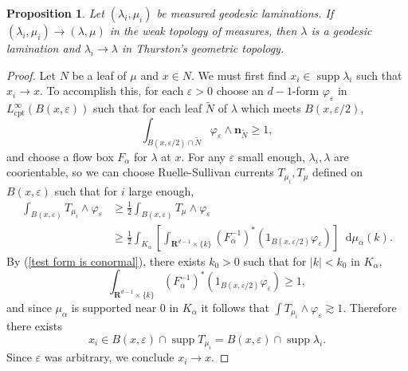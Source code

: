 \documentclass[reqno,10pt]{amsart}
\newcommand{\RR}{\mathbf{R}}
\newcommand*\dif{\mathop{}\!\mathrm{d}}
\DeclareMathOperator{\supp}{supp}
\newcommand{\normal}{\mathbf n}
\newcommand{\cpt}{\mathrm{cpt}}
\newtheorem{proposition}[theorem]{Proposition}
\theoremstyle{definition}
\numberwithin{equation}{section}
\begin{document}
\begin{proposition}\label{measured implies Thurston}
Let $(\lambda_i, \mu_i)$ be measured geodesic laminations.
If $(\lambda_i, \mu_i) \to (\lambda, \mu)$ in the weak topology of measures, then $\lambda$ is a geodesic lamination and $\lambda_i \to \lambda$ in Thurston's geometric topology.
\end{proposition}
\begin{proof}
Let $N$ be a leaf of $\mu$ and $x \in N$.
We must first find $x_i \in \supp \lambda_i$ such that $x_i \to x$.
To accomplish this, for each $\varepsilon > 0$ choose an $d-1$-form $\varphi_\varepsilon$ in $L^\infty_\cpt(B(x, \varepsilon))$ such that for each leaf $\tilde N$ of $\lambda$ which meets $B(x, \varepsilon/2)$,
\begin{equation}\label{test form is conormal}
\int_{B(x, \varepsilon/2) \cap \tilde N} \varphi_\varepsilon \wedge \normal_{\tilde N} \geq 1,
\end{equation}
and choose a flow box $F_\alpha$ for $\lambda$ at $x$.
For any $\varepsilon$ small enough, $\lambda_i, \lambda$ are coorientable, so we can choose Ruelle-Sullivan currents $T_{\mu_i}, T_\mu$ defined on $B(x, \varepsilon)$ such that for $i$ large enough, 
\begin{align*}
\int_{B(x, \varepsilon)} T_{\mu_i} \wedge \varphi_\varepsilon
&\geq \frac{1}{2} \int_{B(x, \varepsilon)} T_\mu \wedge \varphi_\varepsilon\\
&\geq \frac{1}{2} \int_{K_\alpha} \left[\int_{\RR^{d - 1} \times \{k\}} (F_\alpha^{-1})^* (1_{B(x, \varepsilon/2)} \varphi_\varepsilon)\right] \dif \mu_\alpha(k).
\end{align*}
By (\ref{test form is conormal}), there exists $k_0 > 0$ such that for $|k| < k_0$ in $K_\alpha$,
$$\int_{\RR^{d - 1} \times \{k\}} (F_\alpha^{-1})^* (1_{B(x, \varepsilon/2)} \varphi_\varepsilon) \geq 1,$$
and since $\mu_\alpha$ is supported near $0$ in $K_\alpha$ it follows that $\int T_{\mu_i} \wedge \varphi_\varepsilon \gtrsim 1$.
Therefore there exists
$$x_i \in B(x, \varepsilon) \cap \supp T_{\mu_i} = B(x, \varepsilon) \cap \supp \lambda_i.$$
Since $\varepsilon$ was arbitrary, we conclude $x_i \to x$.


\end{proof}
\end{document}
